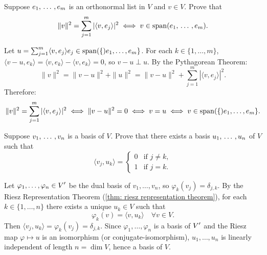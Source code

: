 \begin{xrcs}
  Suppose $e_1, {\, \ldots \,\,}, e_m$ is an orthonormal list in $V$ and $v \in V$. Prove that
  \begin{equation}
    \|v\|^2 = \sum_{j=1}^m |\langle v, e_j \rangle|^2 \iff v \in \operatorname{span} (e_1, {\, \ldots \,\,}, e_m).
  \end{equation}

\begin{xprf}
  Let $u = \sum_{j=1}^m \langle v, e_j \rangle e_j \in \operatorname{span} (\{)e_1, \dots, e_m\}$.
  For each $k \in \{1, \dots, m\}$, $\langle v - u, e_k \rangle = \langle v, e_k \rangle - \langle v, e_k \rangle = 0$, so $v - u \perp u$.
  By the Pythagorean Theorem:
  \[
    \|v\|^2 = \|v - u\|^2 + \|u\|^2 = \|v - u\|^2 + \sum_{j=1}^m |\langle v, e_j \rangle|^2.
  \]
  Therefore:
  \[
    \|v\|^2 = \sum_{j=1}^m |\langle v, e_j \rangle|^2 \iff \|v - u\|^2 = 0 \iff v = u \iff v \in \operatorname{span} (\{)e_1, \dots, e_m\}.
  \]
\end{xprf}
\end{xrcs}

\begin{xrcs}
  Suppose $v_1, {\, \ldots \,\,}, v_n$ is a basis of $V$. Prove that there exists a basis $u_1, {\, \ldots \,\,}, u_n$ of $V$ such that
  \begin{equation}
    \langle v_j, u_k \rangle =
    \begin{cases}
      0 & \text{if } j \neq k, \\
      1 & \text{if } j = k.
    \end{cases}
  \end{equation}

\begin{xprf}
  Let $\varphi_1, \dots, \varphi_n \in \displaystyle V'$ be the dual basis of $v_1, \dots, v_n$, so $\varphi_k(v_j) = \delta_{j,k}$.
  By the Riesz Representation Theorem (\ref{thm: riesz representation theorem}), for each $k \in \{1, \dots, n\}$ there exists a unique $u_k \in V$ such that
  \[
    \varphi_k(v) = \langle v, u_k \rangle \quad \forall v \in V.
  \]
  Then $\langle v_j, u_k \rangle = \varphi_k(v_j) = \delta_{j,k}$.
  Since $\varphi_1, \dots, \varphi_n$ is a basis of $\displaystyle V'$ and the Riesz map $\varphi \mapsto u$ is an isomorphism (or conjugate-isomorphism), $u_1, \dots, u_n$ is linearly independent of length $n = \dim V$, hence a basis of $V$.
\end{xprf}
\end{xrcs}

